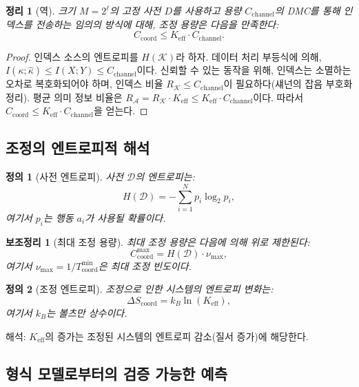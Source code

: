 \documentclass[12pt,a4paper]{article}
\newtheorem{definition}{정의}
\newtheorem{theorem}{정리}
\newtheorem{lemma}{보조정리}
\begin{document}
	\begin{theorem}[역]
		크기 \(M = 2^\ell\)의 고정 사전 \(D\)를 사용하고 용량 \(C_{\mathrm{channel}}\)의 DMC를 통해 인덱스를 전송하는 임의의 방식에 대해, 조정 용량은 다음을 만족한다:
		\[
		C_{\mathrm{coord}} \le K_{\mathrm{eff}} \cdot C_{\mathrm{channel}}.
		\]
	\end{theorem}
	
	\begin{proof}
		인덱스 소스의 엔트로피를 \(H(\mathcal{K})\)라 하자. 데이터 처리 부등식에 의해, \(I(\kappa;\hat{\kappa}) \le I(X;Y) \le C_{\mathrm{channel}}\)이다. 신뢰할 수 있는 동작을 위해, 인덱스는 소멸하는 오차로 복호화되어야 하며, 인덱스 비율 \(R_{\mathcal{K}} \le C_{\mathrm{channel}}\)이 필요하다(섀넌의 잡음 부호화 정리). 평균 의미 정보 비율은 \(R_{\mathcal{A}} = R_{\mathcal{K}} \cdot K_{\mathrm{eff}} \le K_{\mathrm{eff}} \cdot C_{\mathrm{channel}}\)이다. 따라서 \(C_{\mathrm{coord}} \le K_{\mathrm{eff}} \cdot C_{\mathrm{channel}}\)을 얻는다.
	\end{proof}
	
	\subsection{조정의 엔트로피적 해석}
	\label{app:entropy}
	
	\begin{definition}[사전 엔트로피]
		사전 $\mathcal{D}$의 엔트로피는:
		\[
		H(\mathcal{D}) = - \sum_{i=1}^{N} p_i \log_2 p_i,
		\]
		여기서 $p_i$는 행동 $a_i$가 사용될 확률이다.
	\end{definition}
	
	\begin{lemma}[최대 조정 용량]
		최대 조정 용량은 다음에 의해 위로 제한된다:
		\[
		C_{\text{coord}}^{\text{max}} = H(\mathcal{D}) \cdot \nu_{\text{max}},
		\]
		여기서 $\nu_{\text{max}} = 1 / T_{\text{coord}}^{\text{min}}$은 최대 조정 빈도이다.
	\end{lemma}
	
	\begin{definition}[조정 엔트로피]
		조정으로 인한 시스템의 엔트로피 변화는:
		\[
		\Delta S_{\text{coord}} = k_B \ln(K_{\mathrm{eff}}),
		\]
		여기서 $k_B$는 볼츠만 상수이다.
	\end{definition}
	
	해석: $K_{\mathrm{eff}}$의 증가는 조정된 시스템의 엔트로피 감소(질서 증가)에 해당한다.
	
	\subsection{형식 모델로부터의 검증 가능한 예측}
	\label{app:predictions}
	
\end{document}
